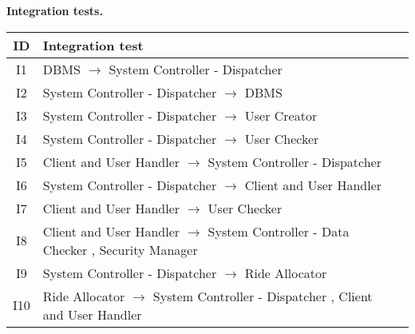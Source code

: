 \documentclass[\mainpath/main]{subfiles}
\begin{document}
\textbf{Integration tests.}\\
\begin{table}[h]
	\centering
	\begin{tabular}[!ht]{c|p{12cm}c}
		ID & Integration test & \\ \hline
		I1 &  \centering DBMS $\rightarrow$ System Controller - Dispatcher  & \\ \hline
		I2 & \centering System Controller - Dispatcher $\rightarrow$ DBMS  & \\ \hline
		I3 & \centering System Controller - Dispatcher $\rightarrow$ User Creator   & \\ \hline
		I4 & \centering System Controller - Dispatcher $\rightarrow$ User Checker   & \\ \hline
		I5 & \centering Client and User Handler $\rightarrow$ System Controller - Dispatcher   & \\ \hline
		I6 & \centering System Controller - Dispatcher $\rightarrow$ Client and User Handler   & \\ \hline
		I7 & \centering Client and User Handler $\rightarrow$ User Checker   & \\ \hline
		I8 & \centering Client and User Handler $\rightarrow$ System Controller - Data Checker , Security Manager   & \\ \hline
		I9 & \centering System Controller - Dispatcher $\rightarrow$ Ride Allocator   & \\ \hline
		I10 & \centering Ride Allocator $\rightarrow$ System Controller - Dispatcher , Client and User Handler   & \\ \hline
	\end{tabular}
\end{table}
\end{document}
